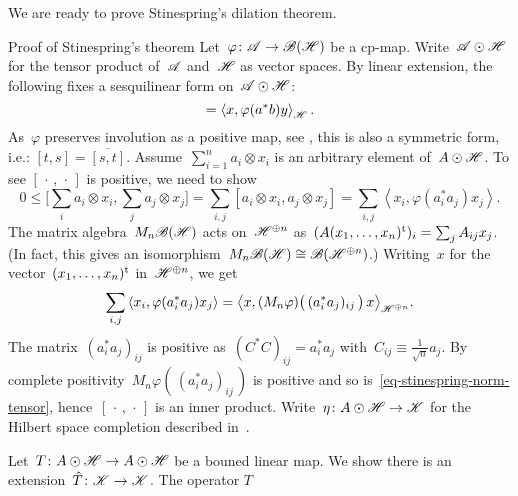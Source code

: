 \documentclass[b]{subfiles}
\begin{document}
\begin{parsec}%
\begin{point}%
We are ready to prove Stinespring's dilation theorem.
\begin{point}{%
    Proof of Stinespring's theorem }%
Let~$\varphi\colon \mathscr{A} \to \mathscr{B}(\mathscr{H})$
    be a cp-map.
Write~$\mathscr{A} \odot \mathscr{H}$ for the tensor product of~$\mathscr{A}$ and~$\mathscr{H}$
    as vector spaces.
By linear extension,
the following fixes a sesquilinear form on~$\mathscr{A} \odot \mathscr{H}$:
\begin{equation*}
    [a\otimes x, b \otimes y] = \left<x, \varphi(a^*b)y\right>_{\scrH}.
\end{equation*}
As~$\varphi$ preserves involution as a positive map,
see , this is also a symmetric form, i.e.: $[t,s]=\overline{[s,t]}$.
    Assume~$\sum^n_{i=1} a_i\otimes x_i$
is an arbitrary element of~$A \odot \mathscr{H}$.
To see $[\,\cdot\,,\,\cdot\,]$ is positive,
we need to show
\begin{equation*}
    0 \leq \bigl[\sum_i a_i\otimes x_i, \sum_j a_j\otimes x_j\bigr]
        = \sum_{i,j} [a_i\otimes x_i, a_j\otimes x_j]
        = \sum_{i,j} \left< x_i, \varphi(a_i^*a_j) x_j \right>.
\end{equation*}
The matrix algebra~$M_n\mathscr{B}(\mathscr{H})$
acts on~$\mathscr{H}^{\oplus n}$
as~$(A (x_1,\ldots,x_n)^{\mathrm{t}})_i = \sum_j A_{ij} x_j$.
(In fact, this gives an
    isomorphism~$M_n\mathscr{B}(\mathscr{H}) \cong \mathscr{B}(\mathscr{H}^{\oplus n})$.)
Writing~$x$ for the vector~$(x_1,\ldots,x_n)^{\mathrm{t}}$ in~$\mathscr{H}^{\oplus n}$,
    we get
\begin{equation}\label{eq-stinespring-norm-tensor}
    \sum_{i,j} \left< x_i, \varphi(a_i^*a_j) x_j \right>
    = \bigl<
    x,
    (M_n\varphi) \bigl(\, (a_i^*a_j)_{ij} \, \bigr)\,
    x \bigr>_{\mathscr{H}^{\oplus n}}.
\end{equation}
The matrix~$(a_i^*a_j)_{ij}$
is positive as~$(C^*C)_{ij} = a_i^*a_j$
    with~$C_{ij} \equiv \frac{1}{\sqrt{n}} a_j$.
    By complete positivity~$M_n\varphi(\,(a_i^*a_j)_{ij}\,)$ is positive
    and so is~\eqref{eq-stinespring-norm-tensor},
    hence~$[\,\cdot\,,\,\cdot\,]$ is an inner product.
Write~$\eta\colon A\odot \mathscr{H} \to \mathscr{K}$ for the Hilbert space completion
    described in~.
\begin{point}%
Let~$T\colon A \odot \mathscr{H} \to A \odot \mathscr{H}$
be a bouned linear map.
We show there is an extension~$\hat{T} \colon \mathscr{K} \to \mathscr{K}$.
The operator $T$

\end{point}
\end{point}
\end{point}
\end{parsec}
\end{document}
